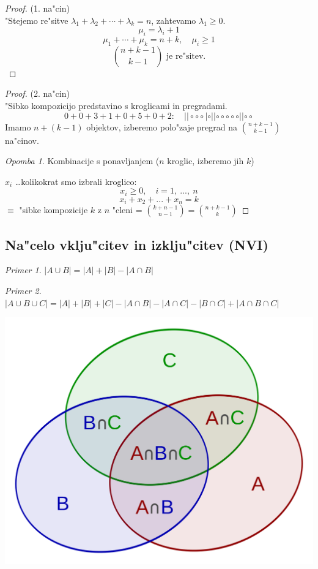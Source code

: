 \documentclass[a4paper,12pt]{article}
\theoremstyle{definition}
\theoremstyle{remark}
\newtheorem*{ex}{Primer}
\newtheorem*{rem}{Opomba}
\begin{document}
\begin{proof}(1. na"cin)\\
	"Stejemo re"sitve $\lambda_1 + \lambda_2 + \cdots + \lambda_k = n$, zahtevamo $\lambda_1 \geqslant 0$.
	\[\mu_i = \lambda_i + 1\]
	\[\mu_1 + \cdots + \mu_k = n + k,\quad \mu_i \geqslant 1\]
	\[\binom{n+k-1}{k-1} \text{ je re"sitev.}\]
\end{proof}
\begin{proof}(2. na"cin)\\
	"Sibko kompozicijo predstavino s kroglicami in pregradami.
	\[0 + 0 + 3 + 1 + 0 + 5 + 0 + 2:\quad ||\circ \circ \circ|\circ||\circ \circ \circ \circ \circ||\circ \circ\]
	Imamo $n + (k - 1)$ objektov, izberemo polo"zaje pregrad na $\binom{n + k - 1}{k - 1}$ na"cinov.\\
	\begin{rem}
		Kombinacije s ponavljanjem ($n$ kroglic, izberemo jih $k$)
	\end{rem}
	$x_i$ \ldots kolikokrat smo izbrali kroglico:
	\[x_i \geqslant 0, \quad i = 1, \ ..., \ n\]
	\[x_i + x_2 + ... + x_n = k\]
	$\equiv$ "sibke kompozicije $k$ z $n$ "cleni = $\binom{k + n - 1}{n - 1} = \binom{n + k - 1}{k}$
\end{proof}

\subsection{Na"celo vklju"citev in izklju"citev (NVI)}
\begin{ex}
	$|A \cup B| = |A| + |B| - |A \cap B|$
\end{ex}
\begin{ex}
	$|A \cup B \cup C| = |A| + |B| + |C| - |A \cap B| - |A \cap C| - |B \cap C| + |A \cap B \cap C|$
	\begin{center}
		\includegraphics[scale=0.1]{nvi}
	\end{center}
\end{ex}
\end{document}

